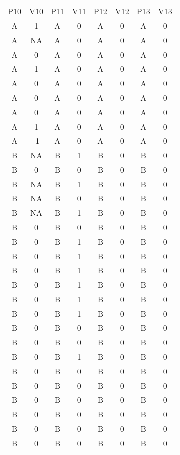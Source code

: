 \documentclass{article}
\begin{document}
\begin{table}

  
\begin{tabular}{c  c  c  c  c  c  c  c}

  P10 & V10 & P11 & V11 & P12 & V12 & P13 & V13\\
A & 1 & A & 0 & A & 0 & A & 0\\
A & NA & A & 0 & A & 0 & A & 0\\
A & 0 & A & 0 & A & 0 & A & 0\\
A & 1 & A & 0 & A & 0 & A & 0\\
A & 0 & A & 0 & A & 0 & A & 0\\
A & 0 & A & 0 & A & 0 & A & 0\\
A & 0 & A & 0 & A & 0 & A & 0\\
A & 1 & A & 0 & A & 0 & A & 0\\
A & -1 & A & 0 & A & 0 & A & 0\\
B & NA & B & 1 & B & 0 & B & 0\\
B & 0 & B & 0 & B & 0 & B & 0\\
B & NA & B & 1 & B & 0 & B & 0\\
B & NA & B & 0 & B & 0 & B & 0\\
B & NA & B & 1 & B & 0 & B & 0\\
B & 0 & B & 0 & B & 0 & B & 0\\
B & 0 & B & 1 & B & 0 & B & 0\\
B & 0 & B & 1 & B & 0 & B & 0\\
B & 0 & B & 1 & B & 0 & B & 0\\
B & 0 & B & 1 & B & 0 & B & 0\\
B & 0 & B & 1 & B & 0 & B & 0\\
B & 0 & B & 1 & B & 0 & B & 0\\
B & 0 & B & 0 & B & 0 & B & 0\\
B & 0 & B & 0 & B & 0 & B & 0\\
B & 0 & B & 1 & B & 0 & B & 0\\
B & 0 & B & 0 & B & 0 & B & 0\\
B & 0 & B & 0 & B & 0 & B & 0\\
B & 0 & B & 0 & B & 0 & B & 0\\
B & 0 & B & 0 & B & 0 & B & 0\\
B & 0 & B & 0 & B & 0 & B & 0\\
B & 0 & B & 0 & B & 0 & B & 0\\


\end{tabular}


\end{table}
\end{document}
